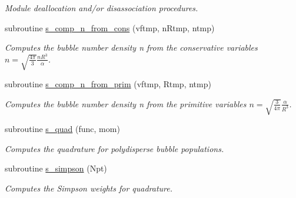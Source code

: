 \begin{DoxyCompactItemize}
\begin{DoxyCompactList}\small\item\em Module deallocation and/or disassociation procedures. \end{DoxyCompactList}\item 
subroutine \hyperlink{namespacem__global__parameters_aac1a5a73b1eae759c913983b38047167}{s\+\_\+comp\+\_\+n\+\_\+from\+\_\+cons} (vftmp, n\+Rtmp, ntmp)
\begin{DoxyCompactList}\small\item\em Computes the bubble number density n from the conservative variables $ n = \sqrt{ \frac{4 \pi}{3} } \frac{ nR^3}{\alpha} $. \end{DoxyCompactList}\item 
subroutine \hyperlink{namespacem__global__parameters_acdaa3827df6fee38a3e55e8b13130c27}{s\+\_\+comp\+\_\+n\+\_\+from\+\_\+prim} (vftmp, Rtmp, ntmp)
\begin{DoxyCompactList}\small\item\em Computes the bubble number density n from the primitive variables $ n = \sqrt{ \frac{3}{4 \pi} } \frac{ \alpha }{ R^3} $. \end{DoxyCompactList}\item 
subroutine \hyperlink{namespacem__global__parameters_aa5a48fa9cc196136634022cfa6708213}{s\+\_\+quad} (func, mom)
\begin{DoxyCompactList}\small\item\em Computes the quadrature for polydisperse bubble populations. \end{DoxyCompactList}\item 
subroutine \hyperlink{namespacem__global__parameters_a78f4bf8bb59af4396bf11aca330463ec}{s\+\_\+simpson} (Npt)
\begin{DoxyCompactList}\small\item\em Computes the Simpson weights for quadrature. \end{DoxyCompactList}\end{DoxyCompactItemize}
